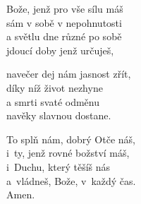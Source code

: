 \begin{translatioMulticol}{3}
Bože, jenž pro vše sílu máš\\
sám v sobě v nepohnutosti\\
a světlu dne různé po sobě\\
jdoucí doby jenž určuješ,\columnbreak

navečer dej nám jasnost zřít,\\
díky níž život nezhyne\\
a smrti svaté odměnu\\
navěky slavnou dostane.\columnbreak

To splň nám, dobrý Otče náš,\\
i~ty, jenž rovné božství máš,\\
i~Duchu, který těšíš nás\\
a~vládneš, Bože, v~každý čas.\\
Amen.
\end{translatioMulticol}
